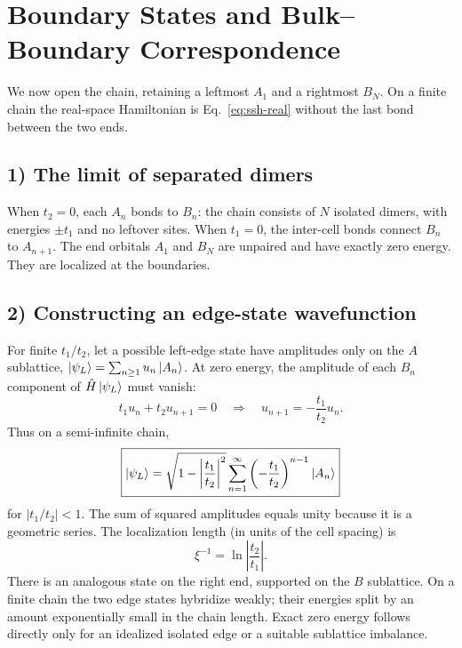 \section{Boundary States and Bulk--Boundary Correspondence}
We now open the chain, retaining a leftmost $A_1$ and a rightmost $B_N$. On a finite chain the real-space Hamiltonian is Eq.~\eqref{eq:ssh-real} without the last bond between the two ends.

\subsection*{1) The limit of separated dimers}
When $t_2=0$, each $A_n$ bonds to $B_n$: the chain consists of $N$ isolated dimers, with energies $\pm t_1$ and no leftover sites. When $t_1=0$, the inter-cell bonds connect $B_n$ to $A_{n+1}$. The end orbitals $A_1$ and $B_N$ are unpaired and have exactly zero energy. They are localized at the boundaries.

\subsection*{2) Constructing an edge-state wavefunction}
For finite $t_1/t_2$, let a possible left-edge state have amplitudes only on the $A$ sublattice,
$\left|\psi_L\right\rangle=\sum_{n\geq1}u_n\left|A_n\right\rangle$.
At zero energy, the amplitude of each $B_n$ component of $\hat{H}\left|\psi_L\right\rangle$ must vanish:
\begin{equation}
 t_1u_n+t_2u_{n+1}=0
 \quad\Longrightarrow\quad
 u_{n+1}=-\frac{t_1}{t_2}u_n.
\end{equation}
Thus on a semi-infinite chain,
\begin{equation}\label{eq:ssh-leftedge}
\boxed{\left|\psi_L\right\rangle=\sqrt{1-\left|\frac{t_1}{t_2}\right|^2}
 \sum_{n=1}^{\infty}\left(-\frac{t_1}{t_2}\right)^{n-1}\left|A_n\right\rangle}
\end{equation}
for $|t_1/t_2|<1$. The sum of squared amplitudes equals unity because it is a geometric series. The localization length (in units of the cell spacing) is
\begin{equation}
 \xi^{-1}=\ln\!\left|\frac{t_2}{t_1}\right|.
\end{equation}
There is an analogous state on the right end, supported on the $B$ sublattice. On a finite chain the two edge states hybridize weakly; their energies split by an amount exponentially small in the chain length. Exact zero energy follows directly only for an idealized isolated edge or a suitable sublattice imbalance.

